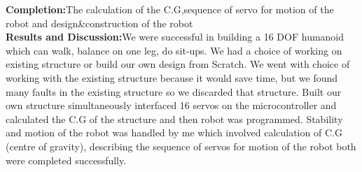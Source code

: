 \documentclass{article}
\begin{document}
\hspace{-5mm}\textbf{Completion:}The calculation of the C.G,sequence of servo for motion of the robot and design\&construction of the robot \\

\hspace{-5mm}\textbf{Results and Discussion:}We were successful in building a 16 DOF humanoid which can walk, balance on one leg, do sit-ups. We had a choice of working on existing structure or build our own design from Scratch. We went with choice of working with the existing structure because it would save time, but we found many faults in the existing structure so we discarded that structure. Built our own structure simultaneously interfaced 16 servos on the microcontroller and calculated the C.G of the structure and then robot was programmed. Stability and motion of the robot was handled by me which involved calculation of C.G (centre of gravity), describing the sequence of servos for motion of the robot both were completed successfully.          \\
\end{document}
